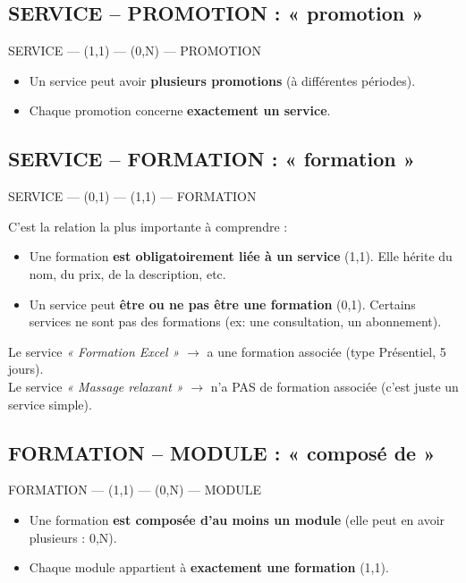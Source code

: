\documentclass[12pt,a4paper]{article}
\begin{document}
\subsection{SERVICE -- PROMOTION : « promotion »}


SERVICE --- (1,1) --- (0,N) --- PROMOTION


\begin{itemize}
    \item Un service peut avoir \textbf{plusieurs promotions} (à différentes périodes).
    \item Chaque promotion concerne \textbf{exactement un service}.
\end{itemize}

\subsection{SERVICE -- FORMATION : « formation »}


SERVICE --- (0,1) --- (1,1) --- FORMATION


C'est la relation la plus importante à comprendre :

\begin{itemize}
    \item Une formation \textbf{est obligatoirement liée à un service} (1,1). Elle hérite du nom, du prix, de la description, etc.
    \item Un service peut \textbf{être ou ne pas être une formation} (0,1). Certains services ne sont pas des formations (ex: une consultation, un abonnement).
\end{itemize}

\begin{exemplebox}
    \small
    Le service \textit{« Formation Excel »} \(\rightarrow\) a une formation associée (type Présentiel, 5 jours).\\
    Le service \textit{« Massage relaxant »} \(\rightarrow\) n'a PAS de formation associée (c'est juste un service simple).
\end{exemplebox}

\subsection{FORMATION -- MODULE : « composé de »}


FORMATION --- (1,1) --- (0,N) --- MODULE


\begin{itemize}
    \item Une formation \textbf{est composée d'au moins un module} (elle peut en avoir plusieurs : 0,N).
    \item Chaque module appartient à \textbf{exactement une formation} (1,1).
\end{itemize}
\end{document}
